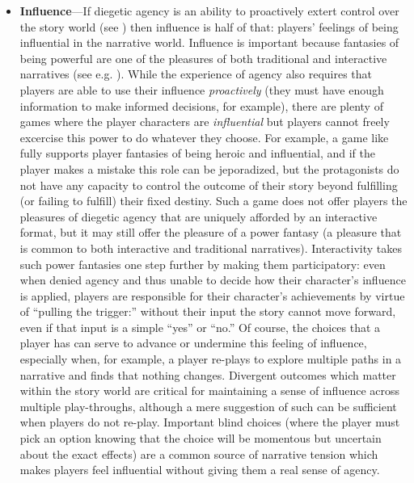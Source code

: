 \begin{itemize}
\item \textbf{Influence}---If diegetic agency is an ability to proactively extert control over the story world (see \citep{Mason2013}) then influence is half of that: players' feelings of being influential in the narrative world.
%
Influence is important because fantasies of being powerful are one of the pleasures of both traditional and interactive narratives (see e.g. \citep{Olson2008}).
%
While the experience of agency also requires that players are able to use their influence \emph{proactively} (they must have enough information to make informed decisions, for example), there are plenty of games where the player characters are \emph{influential} but players cannot freely excercise this power to do whatever they choose.
%
For example, a game like  \citep{FinalFantasy} fully supports player fantasies of being heroic and influential, and if the player makes a mistake this role can be jeporadized, but the protagonists do not have any capacity to control the outcome of their story beyond fulfilling (or failing to fulfill) their fixed destiny.
%
Such a game does not offer players the pleasures of diegetic agency that are uniquely afforded by an interactive format, but it may still offer the pleasure of a power fantasy (a pleasure that is common to both interactive and traditional narratives).
%
Interactivity takes such power fantasies one step further by making them participatory: even when denied agency and thus unable to decide how their character's influence is applied, players are responsible for their character's achievements by virtue of ``pulling the trigger:'' without their input the story cannot move forward, even if that input is a simple ``yes'' or ``no.''
%
Of course, the choices that a player has can serve to advance or undermine this feeling of influence, especially when, for example, a player re-plays to explore multiple paths in a narrative and finds that nothing changes.
%
Divergent outcomes which matter within the story world are critical for maintaining a sense of influence across multiple play-throughs, although a mere suggestion of such can be sufficient when players do not re-play.
%
Important blind choices (where the player must pick an option knowing that the choice will be momentous but uncertain about the exact effects) are a common source of narrative tension which makes players feel influential without giving them a real sense of agency.



\end{itemize}
